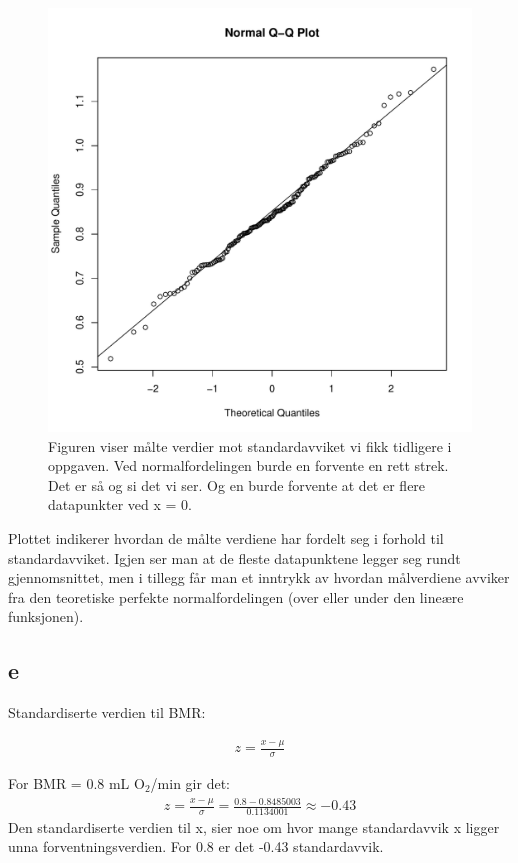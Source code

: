 \begin{figure}[H]
		\centering
		\includegraphics[width=0.9\linewidth]{Rplots.pdf}
		\caption{Figuren viser målte verdier mot standardavviket vi fikk tidligere i oppgaven.
         Ved normalfordelingen burde en forvente en rett strek. Det er så og si det vi ser.
         Og en burde forvente at det er flere datapunkter ved x = 0.}
		\label{fig:QQ}
\end{figure}
Plottet indikerer hvordan de målte verdiene har fordelt seg i forhold til standardavviket. Igjen ser man at de fleste datapunktene legger seg rundt gjennomsnittet, men i tillegg får man et inntrykk av hvordan målverdiene avviker fra den teoretiske perfekte normalfordelingen (over eller under den lineære funksjonen).

\subsection*{e}

Standardiserte verdien til BMR:

\begin{align*}
    z = \frac{x - \mu}{\sigma}
\end{align*}

For BMR = 0.8 mL O$_2$/min gir det:
\begin{align*}
    z = \frac{x - \mu}{\sigma} = \frac{0.8 - 0.8485003}{0.1134001} \approx -0.43
\end{align*}
Den standardiserte verdien til x, sier noe om hvor mange standardavvik x ligger
unna forventningsverdien. For 0.8 er det -0.43 standardavvik.

